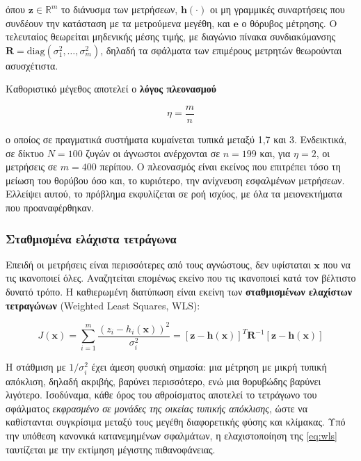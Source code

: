 όπου $\mathbf{z} \in \mathbb{R}^{m}$ το διάνυσμα των μετρήσεων, $\mathbf{h}(\cdot)$ οι μη
γραμμικές συναρτήσεις που συνδέουν την κατάσταση με τα μετρούμενα μεγέθη, και $\mathbf{e}$
ο θόρυβος μέτρησης. Ο τελευταίος θεωρείται μηδενικής μέσης τιμής, με διαγώνιο πίνακα
συνδιακύμανσης $\mathbf{R} = \mathrm{diag}(\sigma_1^2, \ldots, \sigma_m^2)$, δηλαδή τα
σφάλματα των επιμέρους μετρητών θεωρούνται ασυσχέτιστα.

Καθοριστικό μέγεθος αποτελεί ο \textbf{λόγος πλεονασμού}

\begin{equation}
\eta = \frac{m}{n}
\label{eq:redundancy}
\end{equation}

ο οποίος σε πραγματικά συστήματα κυμαίνεται τυπικά μεταξύ 1,7 και 3. Ενδεικτικά, σε δίκτυο
$N = 100$ ζυγών οι άγνωστοι ανέρχονται σε $n = 199$ και, για $\eta = 2$, οι μετρήσεις σε
$m = 400$ περίπου. Ο πλεονασμός είναι εκείνος που επιτρέπει τόσο τη μείωση του θορύβου όσο
και, το κυριότερο, την ανίχνευση εσφαλμένων μετρήσεων. Ελλείψει αυτού, το πρόβλημα
εκφυλίζεται σε ροή ισχύος, με όλα τα μειονεκτήματα που προαναφέρθηκαν.

\subsubsection*{Σταθμισμένα ελάχιστα τετράγωνα}

Επειδή οι μετρήσεις είναι περισσότερες από τους αγνώστους, δεν υφίσταται $\mathbf{x}$ που
να τις ικανοποιεί όλες. Αναζητείται επομένως εκείνο που τις ικανοποιεί κατά τον βέλτιστο
δυνατό τρόπο. Η καθιερωμένη διατύπωση είναι εκείνη των \textbf{σταθμισμένων ελαχίστων
τετραγώνων} (Weighted Least Squares, WLS):

\begin{equation}
J(\mathbf{x}) = \sum_{i=1}^{m} \frac{\left(z_i - h_i(\mathbf{x})\right)^2}{\sigma_i^2}
             = \left[\mathbf{z}-\mathbf{h}(\mathbf{x})\right]^{T} \mathbf{R}^{-1}
               \left[\mathbf{z}-\mathbf{h}(\mathbf{x})\right]
\label{eq:wls}
\end{equation}

Η στάθμιση με $1/\sigma_i^2$ έχει άμεση φυσική σημασία: μια μέτρηση με μικρή τυπική
απόκλιση, δηλαδή ακριβής, βαρύνει περισσότερο, ενώ μια θορυβώδης βαρύνει λιγότερο.
Ισοδύναμα, κάθε όρος του αθροίσματος αποτελεί το τετράγωνο του σφάλματος \emph{εκφρασμένο
σε μονάδες της οικείας τυπικής απόκλισης}, ώστε να καθίστανται συγκρίσιμα μεταξύ τους
μεγέθη διαφορετικής φύσης και κλίμακας. Υπό την υπόθεση κανονικά κατανεμημένων σφαλμάτων,
η ελαχιστοποίηση της \eqref{eq:wls} ταυτίζεται με την εκτίμηση μέγιστης πιθανοφάνειας.

